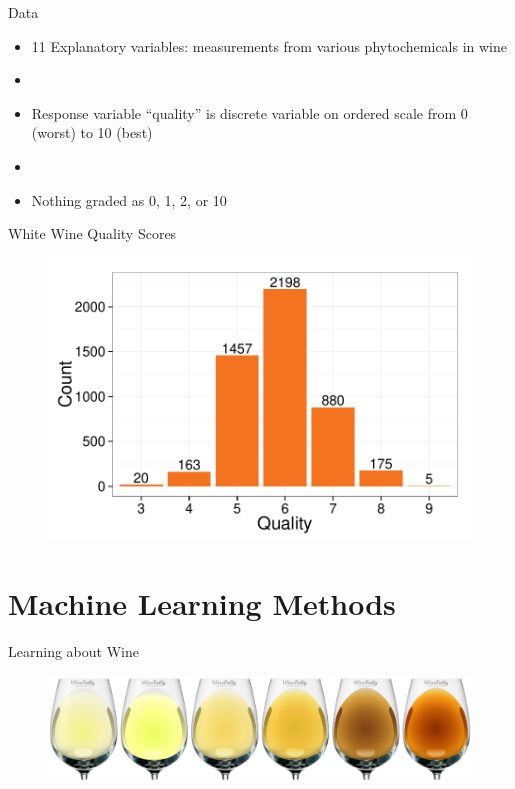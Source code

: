 \documentclass{beamer}
\begin{document}
\begin{frame}{Data}
\begin{itemize}
	
	\item 11 Explanatory variables: measurements from various phytochemicals in wine
	\item[]
	\item Response variable ``quality'' is discrete variable on ordered scale from 0 (worst) to 10 (best)
	\item[]
	\item Nothing graded as 0, 1, 2, or 10	
\end{itemize}
\end{frame}

\begin{frame}{White Wine Quality Scores}
\begin{figure}
	\centering
	\includegraphics[width=\textwidth]{../images/white_hist.pdf}
\end{figure}
\end{frame}

\section{Machine Learning Methods}

\begin{frame}{Learning about Wine}
	\begin{figure}
		\centering
		\includegraphics[width=\textwidth]{../images/gradient.jpg}
	\end{figure}
\end{frame}
\end{document}
